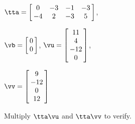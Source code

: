 {$\tta = \left[\hskip -3pt \begin{array}{cccc} 0 & -3 & -1 & -3 \\    -4 & 2 & -3 & 5 \end{array}\hskip -3pt \right] $, 

$\vb=\left[\hskip -3pt \begin{array}{c} 0\\   0 \end{array}\hskip -3pt \right] $, 
$\vu = \left[\hskip -3pt \begin{array}{c} 11 \\ 4 \\ -12 \\ 0 \end{array}\hskip -3pt \right]$, 

$\vv = \left[\hskip -3pt \begin{array}{c} 9\\ -12\\ 0 \\ 12 \end{array}\hskip -3pt \right] $}
{Multiply $\tta\vu$ and $\tta\vv$ to verify.}





